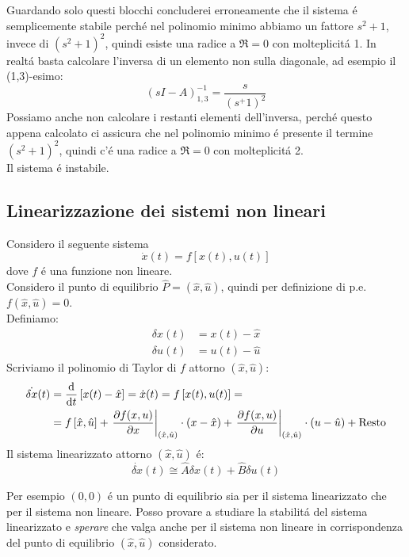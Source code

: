 \documentclass[../main.tex]{subfiles}
\begin{document}
		Guardando solo questi blocchi concluderei erroneamente che il sistema \'e semplicemente stabile perch\'e nel polinomio minimo abbiamo un fattore $ s^2+1 $, invece di $ (s^2+1)^2 $, quindi esiste una radice a $ \Re = 0 $ con molteplicit\'a 1. In realt\'a basta calcolare l'inversa di un elemento non sulla diagonale, ad esempio il (1,3)-esimo:
		\[ (sI-A)^{-1}_{1,3} = \frac{s}{(s^+1)^2} \]
		Possiamo anche non calcolare i restanti elementi dell'inversa, perch\'e questo appena calcolato ci assicura che nel polinomio minimo \'e presente il termine $ (s^2+1)^2 $, quindi c'\'e una radice a $ \Re=0 $ con molteplicit\'a 2.\\
		Il sistema \'e instabile.
		
	\subsection{Linearizzazione dei sistemi non lineari}
		Considero il seguente sistema
		\begin{equation*}
			\dot x(t) = f \left[ x(t), u(t) \right]
		\end{equation*}
		dove $ f $ \'e una funzione non lineare.\\
		Considero il punto di equilibrio $ \hat P=(\hat x, \hat u) $, quindi per definizione di p.e. $ f(\hat x, \hat u) = 0 $.\\
		Definiamo:
		\begin{align*}
			\delta x(t) &= x(t) - \hat x\\
			\delta u(t) &= u(t) - \hat u
		\end{align*}
		Scriviamo il polinomio di Taylor di $ f $ attorno $ (\hat x, \hat u) $:
		\begin{align*}
			\dot{\delta x}(t) &= \frac{\mathrm{d} }{\mathrm{d} t}\left[ x(t) - \hat x \right] = \dot x(t) = f \left[ x(t), u(t) \right] =\\
			&= f \left[ \hat x, \hat u \right] + \left. \frac{\partial f(x,u)}{\partial x} \right|_{(\hat x, \hat u)} \cdot (x - \hat x) + \left. \frac{\partial f(x,u)}{\partial u} \right|_{(\hat x, \hat u)} \cdot (u - \hat u) + \text{Resto}
		\end{align*}
		Il sistema linearizzato attorno $ (\hat x, \hat u) $ \'e:
		\begin{equation}
			\dot{\delta x}(t) \cong \hat A \delta x(t) + \hat B \delta u(t)
		\end{equation}
		
		Per esempio $ (0,0) $ \'e un punto di equilibrio sia per il sistema linearizzato che per il sistema non lineare. Posso provare a studiare la stabilit\'a del sistema linearizzato e \textit{sperare} che valga anche per il sistema non lineare in corrispondenza del punto di equilibrio $ (\hat x, \hat u) $ considerato.
		
\end{document}
